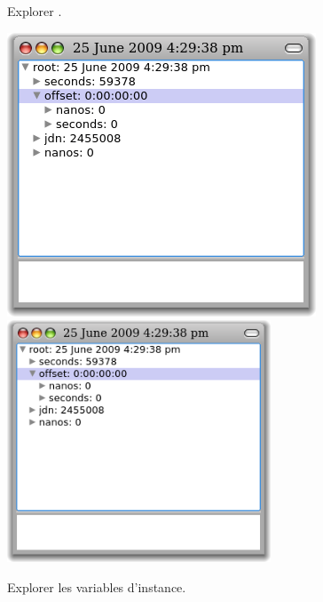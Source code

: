 \documentclass[a4paper,10pt,twoside]{book}
\begin{document}
\begin{figure}[tbp]
\begin{minipage}{0.48\textwidth}
\begin{center}
	\end{center}
	\caption{Explorer .}
\end{minipage}
\hfill
\begin{minipage}{0.48\textwidth}
	\begin{center}
	\ifluluelse
		{\includegraphics[width=\textwidth]{exploreTimeStampNow2}}
		{\includegraphics[width=0.7\textwidth]{exploreTimeStampNow2}}
	\end{center}
	\caption{Explorer les variables d'instance.}
\end{minipage}
\end{figure}
\end{document}
